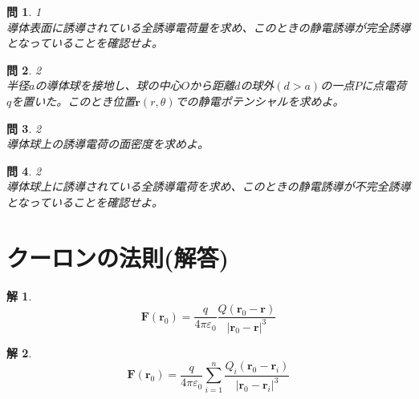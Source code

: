 \documentclass{jsarticle}
\newtheorem{pro}{問}[section]
\newtheorem{ans}{解}[section]
\begin{document}
\begin{pro}1\\
導体表面に誘導されている全誘導電荷量を求め、このときの静電誘導が完全誘導となっていることを確認せよ。
\end{pro}

\begin{pro}2\\
半径\(a\)の導体球を接地し、球の中心\(O\)から距離\(d\)の球外\((d>a)\)の一点\(P\)に点電荷\(q\)を置いた。このとき位置\(\bm{r}(r,\theta)\)での静電ポテンシャルを求めよ。
\end{pro}

\begin{pro}2\\
導体球上の誘導電荷の面密度を求めよ。
\end{pro}

\begin{pro}2\\
導体球上に誘導されている全誘導電荷を求め、このときの静電誘導が不完全誘導となっていることを確認せよ。
\end{pro}










































\newpage
\setcounter{section}{0}
\section{クーロンの法則(解答)}
\noindent
\begin{ans}~\\
\[\bm{F}(\bm{r}_{0})=\frac{q}{4\pi\varepsilon_{0}}\frac{Q(\bm{r}_{0}-\bm{r})}{\left|\bm{r}_{0}-\bm{r}\right|^{3}}\]
\end{ans}

\begin{ans}~\\
\[\bm{F}(\bm{r}_{0})=\frac{q}{4\pi\varepsilon_{0}}\sum_{i=1}^{n}\frac{Q_{i}(\bm{r}_{0}-\bm{r}_{i})}{\left|\bm{r}_{0}-\bm{r}_{i}\right|^{3}}\]
\end{ans}
\end{document}
